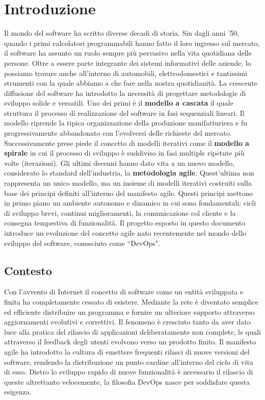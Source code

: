 
\chapter{Introduzione}\label{chap:introduction}
Il mondo del software ha scritto diverse decadi di storia. Sin dagli anni '50, quando i primi calcolatori programmabili hanno fatto il loro ingresso sul mercato, il software ha assunto un ruolo sempre più pervasivo nella vita quotidiana delle persone. Oltre a essere parte integrante dei sistemi informativi delle aziende, lo possiamo trovare anche all'interno di automobili, elettrodomestici e tantissimi strumenti con la quale abbiamo a che fare nella nostra quotidianità. La crescente diffusione del software ha introdotto la necessità di progettare metodologie di sviluppo solide e versatili. Uno dei primi è il \textbf{modello a cascata} il quale struttura il processo di realizzazione del software in fasi sequenziali lineari. Il modello riprende la tipica organizzazione della produzione manifatturiera e fu progressivamente abbandonato con l'evolversi delle richieste del mercato. Successivamente prese piede il concetto di modelli iterativi come il \textbf{modello a spirale} in cui il processo di sviluppo è suddiviso in fasi multiple ripetute più volte (iterazioni). Gli ultimi decenni hanno dato vita a un nuovo modello, considerato lo standard dell'industria, la \textbf{metodologia agile}. Quest'ultima non rappresenta un unico modello, ma un insieme di modelli iterativi costruiti sulla base dei principi definiti all'interno del manifesto agile. Questi principi mettono in primo piano un ambiente autonomo e dinamico in cui sono fondamentali: cicli di sviluppo brevi, continui miglioramenti, la comunicazione col cliente e la consegna tempestiva di funzionalità. Il progetto esposto in questo documento introduce un evoluzione del concetto agile nato recentemente nel mondo dello sviluppo del software, conosciuto come ``DevOps".

\section{Contesto}
Con l'avvento di Internet il concetto di software come un entità sviluppata e finita ha completamente cessato di esistere. Mediante la rete è diventato semplice ed efficiente distribuire un programma e fornire un ulteriore supporto attraverso aggiornamenti evolutivi e correttivi. Il fenomeno è cresciuto tanto da aver dato luce alla pratica del rilascio di applicazioni deliberatamente non complete, le quali attraverso il feedback degli utenti evolvono verso un prodotto finito. Il manifesto agile ha introdotto la cultura di emettere frequenti rilasci di nuove versioni del software, rendendo la distribuzione un punto cardine all'interno del ciclo di vita di esso. Dietro lo sviluppo rapido di nuove funzionalità è necessario il rilascio di queste altrettanto velocemente, la filosofia DevOps nasce per soddisfare questa esigenza.


